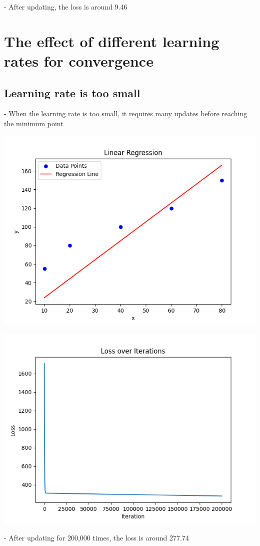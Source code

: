 \documentclass{article}
\begin{document}
- After updating, the loss is around 9.46

\section{The effect of different learning rates for convergence}
\subsection{Learning rate is too small}
- When the learning rate is too small, it requires many updates before reaching
the minimum point
\begin{center}
    \includegraphics[width=0.5\linewidth]{3.png}

    \includegraphics[width=0.5\linewidth]{4.png}
\end{center}

- After updating for 200,000 times, the loss is around 277.74
\end{document}
